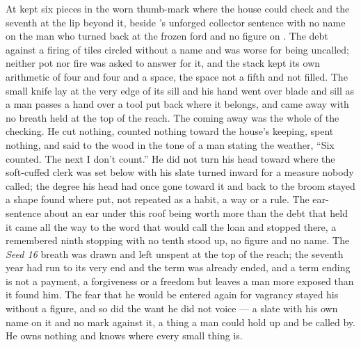\scenebreak

At   kept six pieces in the worn thumb-mark where the house could check and the seventh at the lip beyond it, beside 's unforged collector sentence with no name on the man who turned back at the frozen ford and no figure on . The debt against a firing of tiles circled without a name and was worse for being uncalled; neither pot nor fire was asked to answer for it, and the stack kept its own arithmetic of four and four and a space, the space not a fifth and not filled. The small knife lay at the very edge of its sill and his hand went over blade and sill as a man passes a hand over a tool put back where it belongs, and came away with no breath held at the top of the reach. The coming away was the whole of the checking. He cut nothing, counted nothing toward the house's keeping, spent nothing, and said to the wood in the tone of a man stating the weather, “Six counted. The next I don't count.” He did not turn his head toward  where the soft-cuffed clerk was set below  with his slate turned inward for a measure nobody called; the degree his head had once gone toward it and back to the broom stayed a shape found where put, not repeated as a habit, a way or a rule. The ear-sentence about an ear under this roof being worth more than the debt that held it came all the way to the word that would call the loan and stopped there, a remembered ninth stopping with no tenth stood up, no figure and no name. The \emph{Seed 16} breath was drawn and left unspent at the top of the reach; the seventh year had run to its very end and the term was already ended, and a term ending is not a payment, a forgiveness or a freedom but leaves a man more exposed than it found him. The fear that he would be entered again for vagrancy stayed his without a figure, and so did the want he did not voice --- a slate with his own name on it and no mark against it, a thing a man could hold up and be called by. He owns nothing and knows where every small thing is.

